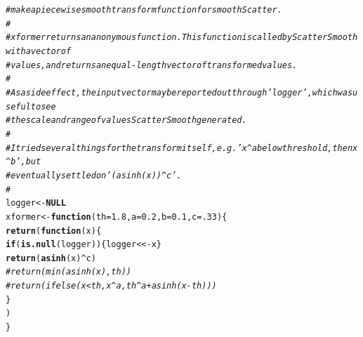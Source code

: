 \documentclass{article}\usepackage[]{graphicx}\usepackage[]{color}
\makeatletter
\newcommand{\hlnum}[1]{\textcolor[rgb]{0.686,0.059,0.569}{#1}}%
\newcommand{\hlcom}[1]{\textcolor[rgb]{0.678,0.584,0.686}{\textit{#1}}}%
\newcommand{\hlopt}[1]{\textcolor[rgb]{0,0,0}{#1}}%
\newcommand{\hlstd}[1]{\textcolor[rgb]{0.345,0.345,0.345}{#1}}%
\newcommand{\hlkwa}[1]{\textcolor[rgb]{0.161,0.373,0.58}{\textbf{#1}}}%
\newcommand{\hlkwb}[1]{\textcolor[rgb]{0.69,0.353,0.396}{#1}}%
\newcommand{\hlkwc}[1]{\textcolor[rgb]{0.333,0.667,0.333}{#1}}%
\newcommand{\hlkwd}[1]{\textcolor[rgb]{0.737,0.353,0.396}{\textbf{#1}}}%
\newenvironment{kframe}{%
 \def\at@end@of@kframe{}%
 \ifinner\ifhmode%
  \def\at@end@of@kframe{\end{minipage}}%
  \begin{minipage}{\columnwidth}%
 \fi\fi%
 \def\FrameCommand##1{\hskip\@totalleftmargin \hskip-\fboxsep
 \colorbox{shadecolor}{##1}\hskip-\fboxsep
     \hskip-\linewidth \hskip-\@totalleftmargin \hskip\columnwidth}%
 \MakeFramed {\advance\hsize-\width
   \@totalleftmargin\z@ \linewidth\hsize
   \@setminipage}}%
 {\par\unskip\endMakeFramed%
 \at@end@of@kframe}
\newenvironment{knitrout}{}{} %
\makeatother
\begin{document}
\begin{knitrout}\footnotesize
{}\color{fgcolor}\begin{kframe}
\begin{alltt}
\hlcom{# make a piecewise smooth transform function for smoothScatter. }
\hlcom{#}
\hlcom{#   xformer returns an anonymous function. This function is called by ScatterSmooth with a vector of}
\hlcom{#   values, and returns an equal-length vector of transformed values. }
\hlcom{#}
\hlcom{#   As a side effect, the input vector may be reported out through 'logger', which was useful to see}
\hlcom{#   the scale and range of values ScatterSmooth generated. }
\hlcom{#}
\hlcom{#   I tried several things for the transform itself, e.g. 'x^a below threshold, then x^b', but}
\hlcom{#   eventually settled on '(asinh(x))^c'.}
\hlcom{#}
\hlstd{logger} \hlkwb{<-} \hlkwa{NULL}
\hlstd{xformer} \hlkwb{<-} \hlkwa{function}\hlstd{(}\hlkwc{th} \hlstd{=} \hlnum{1.8}\hlstd{,} \hlkwc{a} \hlstd{=} \hlnum{0.2}\hlstd{,} \hlkwc{b} \hlstd{=} \hlnum{0.1}\hlstd{,} \hlkwc{c}\hlstd{=}\hlnum{.33}\hlstd{)\{}
  \hlkwd{return}\hlstd{(}\hlkwa{function}\hlstd{(}\hlkwc{x}\hlstd{)\{}
    \hlkwa{if}\hlstd{(}\hlkwd{is.null}\hlstd{(logger))\{logger} \hlkwb{<<-} \hlstd{x\}}
    \hlkwd{return}\hlstd{(}\hlkwd{asinh}\hlstd{(x)}\hlopt{^}\hlstd{c)}
    \hlcom{#return(min(asinh(x),th))}
    \hlcom{#return(ifelse(x<th, x^a, th^a + asinh(x-th)))}
  \hlstd{\}}
  \hlstd{)}
\hlstd{\}}
\end{alltt}
\end{kframe}
\end{knitrout}
\end{document}
